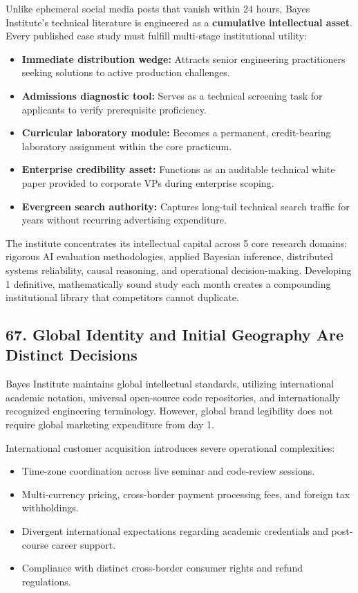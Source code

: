 Unlike ephemeral social media posts that vanish within 24 hours, Bayes Institute's technical literature is engineered as a \textbf{cumulative intellectual asset}. Every published case study must fulfill multi-stage institutional utility:
\begin{itemize}[leftmargin=*,itemsep=1pt]
  \item \textbf{Immediate distribution wedge:} Attracts senior engineering practitioners seeking solutions to active production challenges.
  \item \textbf{Admissions diagnostic tool:} Serves as a technical screening task for applicants to verify prerequisite proficiency.
  \item \textbf{Curricular laboratory module:} Becomes a permanent, credit-bearing laboratory assignment within the core practicum.
  \item \textbf{Enterprise credibility asset:} Functions as an auditable technical white paper provided to corporate VPs during enterprise scoping.
  \item \textbf{Evergreen search authority:} Captures long-tail technical search traffic for years without recurring advertising expenditure.
\end{itemize}

The institute concentrates its intellectual capital across 5 core research domains: rigorous AI evaluation methodologies, applied Bayesian inference, distributed systems reliability, causal reasoning, and operational decision-making. Developing 1 definitive, mathematically sound study each month creates a compounding institutional library that competitors cannot duplicate.

\subsection*{67. Global Identity and Initial Geography Are Distinct Decisions}

Bayes Institute maintains global intellectual standards, utilizing international academic notation, universal open-source code repositories, and internationally recognized engineering terminology. However, global brand legibility does not require global marketing expenditure from day 1.

International customer acquisition introduces severe operational complexities:
\begin{itemize}[leftmargin=*,itemsep=1pt]
  \item Time-zone coordination across live seminar and code-review sessions.
  \item Multi-currency pricing, cross-border payment processing fees, and foreign tax withholdings.
  \item Divergent international expectations regarding academic credentials and post-course career support.
  \item Compliance with distinct cross-border consumer rights and refund regulations.
\end{itemize}

